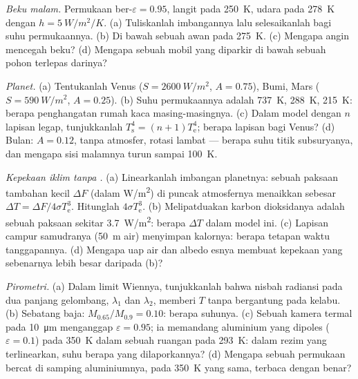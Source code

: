 \begin{exercise}[$\star\star$]\label{exo:b2:thermal-radiation:9}
\emph{Beku malam.} Permukaan ber-$\varepsilon = 0.95$, langit pada \qty{250}{K}, udara pada
\qty{278}{K} dengan $h = \qty{5}{W/m^2/K}$. (a) Tuliskanlah imbangannya lalu selesaikanlah
bagi suhu permukaannya. (b) Di bawah sebuah awan pada \qty{275}{K}. (c) Mengapa
angin mencegah beku? (d) Mengapa sebuah mobil yang diparkir di bawah sebuah pohon terlepas
darinya?
\end{exercise}

\begin{exercise}[$\star\star\star$]\label{exo:b2:thermal-radiation:10}
\emph{Planet.} (a) Tentukanlah  Venus ($S = \qty{2600}{W/m^2}$,
$A = 0.75$), Bumi, Mars ($S = \qty{590}{W/m^2}$, $A = 0.25$). (b) Suhu
permukaannya adalah \qty{737}{K}, \qty{288}{K}, \qty{215}{K}:
berapa penghangatan rumah kaca masing-masingnya. (c) Dalam model dengan $n$ lapisan legap,
tunjukkanlah $T_{\text{s}}^4 = (n + 1)T_{\text{e}}^4$; berapa lapisan bagi Venus?
(d) Bulan: $A = 0.12$, tanpa atmosfer, rotasi lambat --- berapa suhu
titik subsuryanya, dan mengapa sisi malamnya turun sampai \qty{100}{K}.
\end{exercise}

\begin{exercise}[$\star\star\star$]\label{exo:b2:thermal-radiation:11}
\emph{Kepekaan iklim tanpa .} (a) Linearkanlah
imbangan planetnya: sebuah paksaan tambahan kecil $\Delta F$ (dalam \unit{W/m^2}) di
puncak atmosfernya menaikkan  sebesar $\Delta T
= \Delta F/4\sigma T_{\text{e}}^3$. Hitunglah $4\sigma T_{\text{e}}^3$. (b)
Melipatduakan karbon dioksidanya adalah sebuah paksaan sekitar \qty{3.7}{W/m^2}:
berapa $\Delta T$ dalam model ini. (c) Lapisan campur samudranya (\qty{50}{m}
air) menyimpan kalornya: berapa tetapan waktu tanggapannya. (d) Mengapa 
uap air dan albedo esnya membuat kepekaan yang sebenarnya lebih besar
daripada (b)?
\end{exercise}

\begin{exercise}[$\star\star\star$]\label{exo:b2:thermal-radiation:12}
\emph{Pirometri.} (a) Dalam limit Wiennya, tunjukkanlah bahwa nisbah
radiansi pada dua panjang gelombang, $\lambda_1$ dan $\lambda_2$, memberi $T$
tanpa bergantung pada  kelabu. (b) Sebatang baja: $M_{0.65}/M_{0.9}
= 0.10$: berapa suhunya. (c) Sebuah kamera termal pada \qty{10}{\micro m} menganggap
$\varepsilon = 0.95$; ia memandang aluminium yang dipoles ($\varepsilon = 0.1$)
pada \qty{350}{K} dalam sebuah ruangan pada \qty{293}{K}: dalam rezim yang terlinearkan,
suhu berapa yang dilaporkannya? (d) Mengapa sebuah permukaan bercat di samping
aluminiumnya, pada \qty{350}{K} yang sama, terbaca dengan benar?
\end{exercise}

